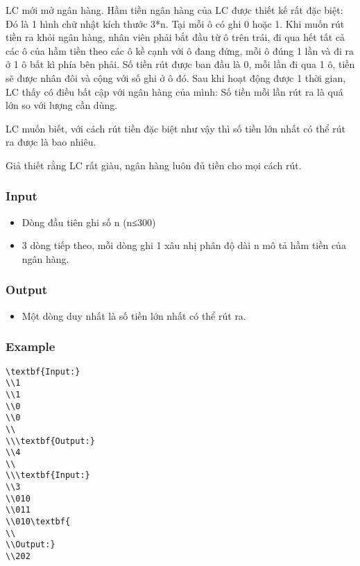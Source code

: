 



   LC mới mở ngân hàng. Hầm tiền ngân hàng của LC được thiết kế rất đặc biệt: Đó là 1 hình chữ nhật kích thước 3*n. Tại mỗi ô có ghi 0 hoặc 1. Khi muốn rút tiền ra khỏi ngân hàng, nhân viên phải bắt đầu từ ô trên trái, đi qua hết tất cả các ô của hầm tiền theo các ô kề cạnh với ô đang đứng, mỗi ô đúng 1 lần và đi ra ở 1 ô bất kì phía bên phải. Số tiền rút được ban đầu là 0, mỗi lần đi qua 1 ô, tiền sẽ được nhân đôi và cộng với số ghi ở ô đó. Sau khi hoạt động được 1 thời gian, LC thấy có điều bất cập với ngân hàng của mình: Số tiền mỗi lần rút ra là quá lớn so với lượng cần dùng.  

   LC muốn biết, với cách rút tiền đặc biệt như vậy thì số tiền lớn nhất có thể rút ra được là bao nhiêu.  

Giả thiết rằng LC rất giàu, ngân hàng luôn đủ tiền cho mọi cách rút.

\subsubsection{   Input  }
\begin{itemize}
	\item     Dòng đầu tiên ghi số n (n≤300)   
	\item     3 dòng tiếp theo, mỗi dòng ghi 1 xâu nhị phân độ dài n mô tả hầm tiền của ngân hàng.   
\end{itemize}

\subsubsection{   Output  }
\begin{itemize}
	\item     Một dòng duy nhất là số tiền lớn nhất có thể rút ra.   
\end{itemize}

\subsubsection{   Example  }
\begin{verbatim}
\textbf{Input:}
\\1
\\1
\\0
\\0
\\
\\\textbf{Output:}
\\4
\\
\\\textbf{Input:}
\\3
\\010
\\011
\\010\textbf{
\\
\\Output:}
\\202\end{verbatim}
